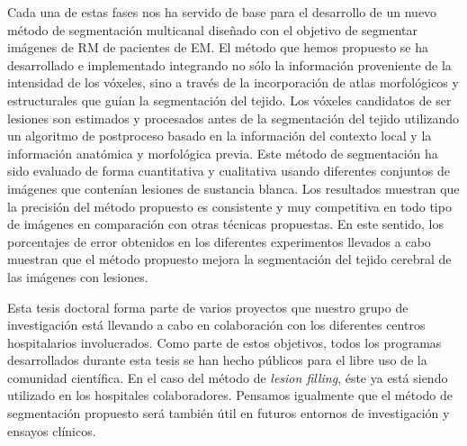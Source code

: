 Cada una de estas fases nos ha servido de base para el desarrollo de un nuevo método de segmentación multicanal diseñado con el objetivo de segmentar imágenes de RM de pacientes de EM.  El método que hemos propuesto se ha desarrollado e implementado integrando no sólo la información proveniente de la intensidad de los vóxeles, sino a través de la incorporación de atlas morfológicos y estructurales que guían la segmentación del tejido. Los vóxeles candidatos de ser lesiones son estimados y procesados antes de la segmentación del tejido utilizando un algoritmo de postproceso basado en la información del contexto local y la información anatómica y morfológica previa. Este método de segmentación ha sido evaluado de forma cuantitativa y cualitativa usando diferentes conjuntos de imágenes que contenían lesiones de sustancia blanca. Los resultados muestran que la precisión del método propuesto es consistente y muy competitiva en todo tipo de imágenes en comparación con otras técnicas propuestas. En este sentido, los porcentajes de error obtenidos en los diferentes experimentos llevados a cabo muestran que el método propuesto mejora la segmentación del tejido cerebral de las imágenes con lesiones.

Esta tesis doctoral forma parte de varios proyectos que nuestro grupo de investigación está llevando a cabo en colaboración con los diferentes centros hospitalarios involucrados. Como parte de estos objetivos, todos los programas desarrollados durante esta tesis se han hecho públicos para el libre uso de la comunidad científica. En el caso del método de \textit{lesion filling}, éste ya está siendo utilizado en los hospitales colaboradores. Pensamos igualmente que el método de segmentación propuesto será también útil en futuros entornos de investigación y ensayos clínicos.

 
